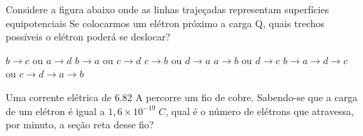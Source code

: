 \documentclass[12pt, addpoints]{exam}
\begin{document}
    \begin{questions}
\begin{multicols*}{2}
\question Considere a figura abaixo onde as linhas trajeçadas representam superfícies equipotenciais Se colocarmos um elétron próximo a carga Q, quais trechos possíveis o elétron poderá se deslocar?
        
        \begin{center}
            \begin{minipage}[c]{0.5\linewidth}
            \end{minipage}
        \end{center}
        
        

\begin{choices}
\choice $b\rightarrow c$ ou $a\rightarrow d$ 
\choice $b\rightarrow a$ ou $c\rightarrow d$ 
\choice $c\rightarrow b$ ou $d\rightarrow a$ 
\choice $a\rightarrow b$ ou $d\rightarrow c$ 
\choice $b\rightarrow a\rightarrow d\rightarrow c$ ou $c\rightarrow d\rightarrow a\rightarrow b$ 
\end{choices}
\question Uma corrente elétrica de    6.82 A percorre um ﬁo de cobre. Sabendo-se que a carga de um elétron é igual a $1,6\times 10^{-19}\;C$, qual é o número de elétrons que atravessa, por minuto, a seção reta desse ﬁo?


\end{multicols*}
\end{questions}
\end{document}
